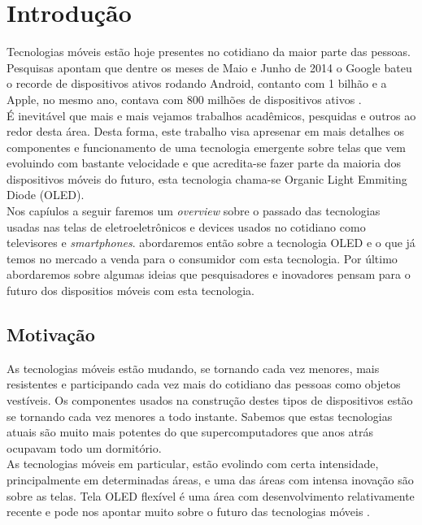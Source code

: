 \chapter{Introdução}
\label{cap:introducao}

Tecnologias móveis estão hoje presentes no cotidiano da maior parte das pessoas. Pesquisas apontam que dentre os meses de Maio e Junho de 2014 o Google bateu o recorde de dispositivos ativos rodando Android, contanto com 1 bilhão e a Apple, no mesmo ano, contava com 800 milhões de dispositivos ativos \cite{ResumoGoogleIOBAM:2014}. \\

É inevitável que mais e mais vejamos trabalhos acadêmicos, pesquidas e outros ao redor desta área. Desta forma, este trabalho visa apresenar em mais detalhes os componentes e funcionamento de uma tecnologia emergente sobre telas que vem evoluindo com bastante velocidade e que acredita-se fazer parte da maioria dos dispositivos móveis do futuro, esta tecnologia chama-se Organic Light Emmiting Diode (OLED). \\

Nos capíulos a seguir faremos um \textit{overview} sobre o passado das tecnologias usadas nas telas de eletroeletrônicos e devices usados no cotidiano como televisores e \textit{smartphones}. abordaremos então sobre a tecnologia OLED e o que já temos no mercado a venda para o consumidor com esta tecnologia. Por último abordaremos sobre algumas ideias que pesquisadores e inovadores pensam para o futuro dos dispositios móveis com esta tecnologia. 


\section{Motivação}
\label{sec:motivacao}

As tecnologias móveis estão mudando, se tornando cada vez menores, mais resistentes e participando cada vez mais do cotidiano das pessoas como objetos vestíveis. Os componentes usados na construção destes tipos de dispositivos estão se tornando cada vez menores a todo instante. Sabemos que estas tecnologias atuais são muito mais potentes do que supercomputadores que anos atrás ocupavam todo um dormitório. \\

As tecnologias móveis em particular, estão evolindo com certa intensidade, principalmente em determinadas áreas, e uma das áreas com intensa inovação são sobre as telas. Tela OLED flexível é uma área com desenvolvimento relativamente recente e pode nos apontar muito sobre o futuro das tecnologias móveis \cite{FOLEDDRS:2014}.\\


